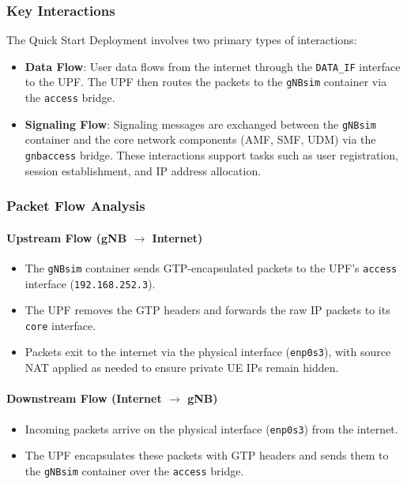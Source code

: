 \subsubsection{Key Interactions}
\label{subsubsec:qs-key-interactions}

The Quick Start Deployment involves two primary types of interactions:

\begin{itemize}
    \item \textbf{Data Flow}: User data flows from the internet through the \texttt{DATA\_IF} interface to the UPF. The UPF then routes the packets to the \texttt{gNBsim} container via the \texttt{access} bridge.
    \item \textbf{Signaling Flow}: Signaling messages are exchanged between the \texttt{gNBsim} container and the core network components (AMF, SMF, UDM) via the \texttt{gnbaccess} bridge. These interactions support tasks such as user registration, session establishment, and IP address allocation.
\end{itemize}

\subsubsection{Packet Flow Analysis}
\label{subsubsec:qs-packet-flow}

\paragraph{Upstream Flow (gNB $\rightarrow$ Internet)}
\begin{itemize}
    \item The \texttt{gNBsim} container sends GTP-encapsulated packets to the UPF’s \texttt{access} interface (\texttt{192.168.252.3}).
    \item The UPF removes the GTP headers and forwards the raw IP packets to its \texttt{core} interface.
    \item Packets exit to the internet via the physical interface (\texttt{enp0s3}), with source NAT applied as needed to ensure private UE IPs remain hidden.
\end{itemize}

\paragraph{Downstream Flow (Internet $\rightarrow$ gNB)}
\begin{itemize}
    \item Incoming packets arrive on the physical interface (\texttt{enp0s3}) from the internet.
    \item The UPF encapsulates these packets with GTP headers and sends them to the \texttt{gNBsim} container over the \texttt{access} bridge.
\end{itemize}

